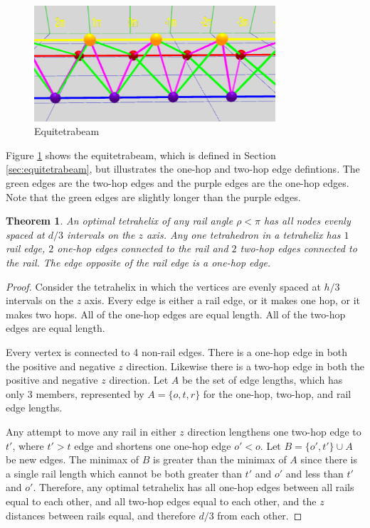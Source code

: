 \documentclass[11pt]{article}
\newtheorem{theorem}{Theorem}
\begin{document}
\begin{figure}[H]
     \centering
     \includegraphics[width=0.8\textwidth]{figures/EquitetrabeamCloseUp.png}
     \caption{Equitetrabeam}
  \label{equitetrabeam}
\end{figure}

Figure \ref{equitetrabeam} shows the equitetrabeam, which is defined in Section \ref{sec:equitetrabeam},
but illustrates the one-hop and two-hop edge defintions.
The green edges are the two-hop edges and the purple edges are the one-hop edges. Note that the green
edges are slightly longer than the purple edges.


\begin{theorem}
  \label{eventhirds}
  An optimal tetrahelix of any rail angle $\rho < \pi$ has all nodes evenly spaced at $d/3$ intervals on the $z$ axis.
  Any one tetrahedron in a tetrahelix has $1$ rail edge, $2$ one-hop edges connected to the rail and $2$ two-hop edges connected to the rail.
  The edge opposite of the rail edge is a one-hop edge.
\end{theorem}

\begin{proof}
    Consider the tetrahelix in which the vertices are evenly spaced at
    $h/3$ intervals on the $z$ axis. Every edge is either a rail edge,
    or it makes one hop, or it makes two hops. All of the one-hop
    edges are equal length.  All of the two-hop edges are equal
    length.

    Every vertex is connected to 4 non-rail edges. There is a one-hop edge
    in both the positive and negative $z$ direction. Likewise there is a two-hop
    edge in both the positive and negative $z$ direction. Let $A$ be the set
    of edge lengths, which has only 3 members, represented by $A = \{o,t,r\}$ for
    the one-hop, two-hop, and rail edge lengths.

    Any attempt to move any rail in either $z$ direction lengthens one two-hop edge to $t'$, where $t' > t$
    edge and shortens one one-hop edge $o' < o$. Let $B = \{o',t' \} \cup A$ be new edges.
    The minimax of $B$ is greater than the minimax of $A$ since there is a single rail length which cannot be both greater
    than $t'$ and $o'$ and less than $t'$ and $o'$.
    Therefore, any optimal tetrahelix has all one-hop edges between all rails equal to each other, and
    all two-hop edges equal to each other, and the $z$ distances between rails equal, and therefore
    $d/3$ from each other.
\end{proof}
\end{document}
